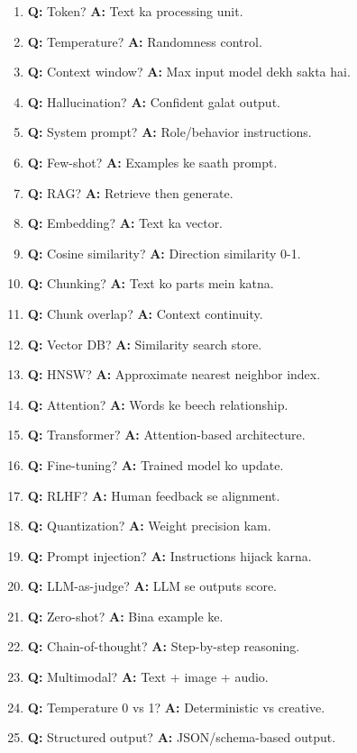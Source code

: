 \begin{enumerate}[label=\arabic*.]
\item \textbf{Q:} Token? \textbf{A:} Text ka processing unit.
\item \textbf{Q:} Temperature? \textbf{A:} Randomness control.
\item \textbf{Q:} Context window? \textbf{A:} Max input model dekh sakta hai.
\item \textbf{Q:} Hallucination? \textbf{A:} Confident galat output.
\item \textbf{Q:} System prompt? \textbf{A:} Role/behavior instructions.
\item \textbf{Q:} Few-shot? \textbf{A:} Examples ke saath prompt.
\item \textbf{Q:} RAG? \textbf{A:} Retrieve then generate.
\item \textbf{Q:} Embedding? \textbf{A:} Text ka vector.
\item \textbf{Q:} Cosine similarity? \textbf{A:} Direction similarity 0-1.
\item \textbf{Q:} Chunking? \textbf{A:} Text ko parts mein katna.
\item \textbf{Q:} Chunk overlap? \textbf{A:} Context continuity.
\item \textbf{Q:} Vector DB? \textbf{A:} Similarity search store.
\item \textbf{Q:} HNSW? \textbf{A:} Approximate nearest neighbor index.
\item \textbf{Q:} Attention? \textbf{A:} Words ke beech relationship.
\item \textbf{Q:} Transformer? \textbf{A:} Attention-based architecture.
\item \textbf{Q:} Fine-tuning? \textbf{A:} Trained model ko update.
\item \textbf{Q:} RLHF? \textbf{A:} Human feedback se alignment.
\item \textbf{Q:} Quantization? \textbf{A:} Weight precision kam.
\item \textbf{Q:} Prompt injection? \textbf{A:} Instructions hijack karna.
\item \textbf{Q:} LLM-as-judge? \textbf{A:} LLM se outputs score.
\item \textbf{Q:} Zero-shot? \textbf{A:} Bina example ke.
\item \textbf{Q:} Chain-of-thought? \textbf{A:} Step-by-step reasoning.
\item \textbf{Q:} Multimodal? \textbf{A:} Text + image + audio.
\item \textbf{Q:} Temperature 0 vs 1? \textbf{A:} Deterministic vs creative.
\item \textbf{Q:} Structured output? \textbf{A:} JSON/schema-based output.
\end{enumerate}


